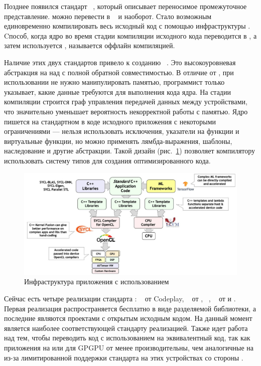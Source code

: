 Позднее появился стандарт ~\cite{SPIR-V}, который описывает 
переносимое промежуточное представление.
 можно перевести в ~\cite{LLVM} и наоборот.
Стало возможным единовременно компилировать весь исходный код с помощью 
инфраструктуры .
Cпособ, когда ядро во время стадии компиляции исходного кода переводится в
, а затем используется , 
называется оффлайн компиляцией.

Наличие этих двух стандартов привело к созданию ~\cite{SYCL}.
Это высокоуровневая абстракция на  над  с полной
обратной совместимостью.
В отличие от , при использовании  не нужно 
манипулировать памятью, программист только указывает, какие данные требуются 
для выполнения кода ядра.
На стадии компиляции строится граф управления передачей данных между 
устройствами, что значительно уменьшает вероятность некорректной работы 
с памятью.
Ядро пишется на стандартном  в коде исходного приложения 
с некоторыми ограничениями --- нельзя использовать исключения, указатели на
функции и виртуальные функции, но можно применять лямбда-выражения, шаблоны, 
наследование и другие абстракции.
Такой дизайн (рис.~\ref{SYCL_infrastructure}) позволяет компилятору 
использовать систему типов  для создания оптимизированного кода.
\begin{figure}
  \centering
  \includegraphics[width=\columnwidth]{sycl.jpg}
  \caption{Инфраструктура приложения с использованием }
  \label{SYCL_infrastructure}
\end{figure}

Сейчас есть четыре реализации стандарта : 
~\cite{ComputeCpp} от Codeplay,
~\cite{DPC} от ,
~\cite{hipSYCL},
~\cite{triSYCL} от  и .
Первая реализация распространяется бесплатно в виде разделяемой библиотеки,
а последние являются проектами с открытым исходным кодом.
На данный момент  является наиболее соответствующей 
стандарту реализацией.
Также идет работа над тем, чтобы переводить код с использованием  на 
эквивалентный  код, так как приложения на  или
 для GPGPU от  менее производительны, чем аналогичные 
на  из-за лимитированной поддержки стандарта  на этих 
устройствах со стороны .

